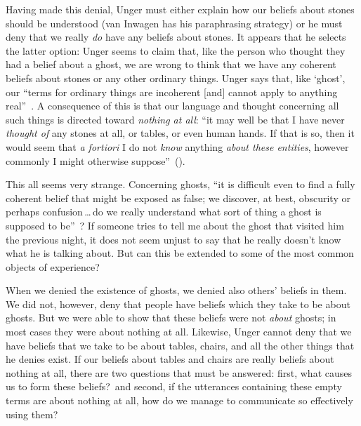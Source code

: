 \documentclass[11pt]{article}
\begin{document}
\begin{spacing}{1.5}
Having made this denial, Unger must either explain how our beliefs about stones should be understood (van Inwagen has his paraphrasing strategy) or he must deny that we really {\em do} have any beliefs about stones. It appears that he selects the latter option: Unger seems to claim that, like the person who thought they had a belief about a ghost, we are wrong to think that we have any coherent beliefs about stones or any other ordinary things. Unger says that, like `ghost', our ``terms for ordinary things are incoherent [and] cannot apply to anything real''~\citep[147]{unger1979}. A consequence of this is that our language and thought concerning all such things is directed toward {\em nothing at all}: ``it may well be that I have never {\em thought of} any stones at all, or tables, or even human hands. If that is so, then it would seem that {\em a fortiori} I do not {\em know} anything {\em about these entities}, however commonly I might otherwise suppose''~(\citeyear[458]{unger1980a}).

This all seems very strange. Concerning ghosts, ``it is difficult even to find a fully coherent belief that might be exposed as false; we discover, at best, obscurity or perhaps confusion\,\ldots\,do we really understand what sort of thing a ghost is supposed to be''~\citep[76]{stroud2000a}? If someone tries to tell me about the ghost that visited him the previous night, it does not seem unjust to say that he really doesn't know what he is talking about. But can this be extended to some of the most common objects of experience?

When we denied the existence of ghosts, we denied also others' beliefs in them. We did not, however, deny that people have beliefs which they take to be about ghosts. But we were able to show that these beliefs were not {\em about} ghosts; in most cases they were about nothing at all. Likewise, Unger cannot deny that we have beliefs that we take to be about tables, chairs, and all the other things that he denies exist. If our beliefs about tables and chairs are really beliefs about nothing at all, there are two questions that must be answered: first, what causes us to form these beliefs?\ and second, if the utterances containing these empty terms are about nothing at all, how do we manage to communicate so effectively using them?


\end{spacing}
\end{document}
